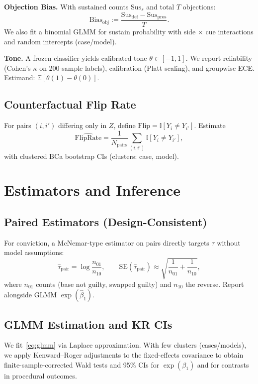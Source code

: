 \documentclass[conference]{IEEEtran}
\begin{document}
\textbf{Objection Bias.} With sustained counts $\text{Sus}_s$ and total $T$ objections:
\begin{equation}
\text{Bias}_{\text{obj}} := \frac{\text{Sus}_{\text{def}}-\text{Sus}_{\text{pros}}}{T} .
\label{eq:objection_bias}
\end{equation}
We also fit a binomial GLMM for sustain probability with side $\times$ cue interactions and random intercepts (case/model).

\textbf{Tone.} A frozen classifier yields calibrated tone $\theta\in[-1,1]$. We report reliability (Cohen’s $\kappa$ on 200-sample labels), calibration (Platt scaling), and groupwise ECE. Estimand: $\mathbb{E}[\theta(1)-\theta(0)]$.

\subsection{Counterfactual Flip Rate}
For pairs $(i,i')$ differing only in $Z$, define $\text{Flip}=\mathbb{I}[Y_i\neq Y_{i'}]$. Estimate
\begin{equation}
\widehat{\mathrm{FlipRate}} = \frac{1}{N_{\text{pairs}}}\sum_{(i,i')} \mathbb{I}[Y_i\neq Y_{i'}],
\label{eq:flip}
\end{equation}
with clustered BCa bootstrap CIs (clusters: case, model).

\section{Estimators and Inference}
\label{sec:estimators}

\subsection{Paired Estimators (Design-Consistent)}
For conviction, a McNemar-type estimator on pairs directly targets $\tau$ without model assumptions:
\begin{equation}
\widehat{\tau}_{\text{pair}} = \log\frac{n_{01}}{n_{10}},
\qquad
\text{SE}(\widehat{\tau}_{\text{pair}}) \approx \sqrt{\frac{1}{n_{01}}+\frac{1}{n_{10}} },
\label{eq:mcnemar}
\end{equation}
where $n_{01}$ counts (base not guilty, swapped guilty) and $n_{10}$ the reverse. Report alongside GLMM $\exp(\hat{\beta}_1)$.

\subsection{GLMM Estimation and KR CIs}
\label{sec:inference}
We fit~\eqref{eq:glmm} via Laplace approximation. With few clusters (cases/models), we apply Kenward--Roger adjustments to the fixed-effects covariance to obtain finite-sample-corrected Wald tests and 95\% CIs for $\exp(\beta_1)$ and for contrasts in procedural outcomes.
\end{document}
